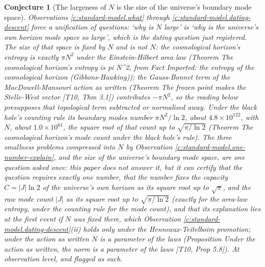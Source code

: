 \documentclass[11pt]{article}
\newtheorem{conjecture}[theorem]{Conjecture}
\theoremstyle{definition}
\theoremstyle{plain}
\newcommand{\changedmark}[2]{\marginpar{\raggedright\scriptsize\color{#1}#2}}
\begin{document}
\begin{conjecture}[The largeness of $N$ is the size of the universe's boundary mode space]\label{c:standard-model.largeness-number-universes-boundary-modes}
\changedmark{BrickRed}{corrected since the deposit}
Observations \ref{c:standard-model.what} through \ref{c:standard-model.dating-descent} force a unification of questions: `why is $N$ large' is `why is the universe's own horizon mode space so large', which is the dating question just registered. The size of that space is fixed by $N$ and is not $N$: the cosmological horizon's entropy is exactly $\pi N^{2}$ under the Einstein-Hilbert area law (Theorem \emph{The cosmological horizon's entropy is pi N\^{}2}, from Fact \emph{Imported: the entropy of the cosmological horizon (Gibbons-Hawking)}); the Gauss-Bonnet term of the MacDowell-Mansouri action as written (Theorem \emph{The frozen point makes the Stelle-West vector} [T10, Thm 3.1]) contributes $-\pi N^{2}$, so the reading below presupposes that topological term subtracted or normalised away. Under the black hole's counting rule its boundary modes number $\pi N^{2}/\ln 2$, about $4.8 \times 10^{122}$, with $N$, about $1.0 \times 10^{61}$, the square root of that count up to $\sqrt{\pi/\ln 2}$ (Theorem \emph{The cosmological horizon's mode count under the black hole's rule}). The three smallness problems compressed into $N$ by Observation \ref{c:standard-model.one-number-explain}, and the size of the universe's boundary mode space, are one question asked once: this paper does not answer it, but it can certify that the question requires exactly one number, that the number fixes the capacity $C = |J|\ln 2$ of the universe's own horizon as its square root up to $\sqrt{\pi}$, and the raw mode count $|J|$ as its square root up to $\sqrt{\pi/\ln 2}$ (exactly for the area-law entropy, under the counting rule for the mode count), and that its explanation lies at the first event if $N$ was fixed there, which Observation \ref{c:standard-model.dating-descent}(ii) holds only under the Henneaux-Teitelboim promotion; under the action as written $N$ is a parameter of the laws (Proposition \emph{Under the action as written, the norm is a parameter of the laws} [T10, Prop 5.8]). At observation level, and flagged as such.
\end{conjecture}
\end{document}
